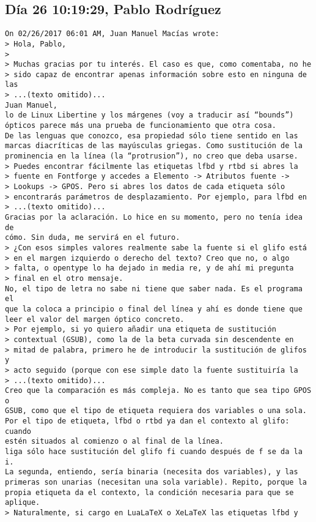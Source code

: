 \documentclass[a4paper,10pt]{article}
\begin{document}
\subsection{Día 26 10:19:29, Pablo Rodríguez}

\begin{lstlisting}
On 02/26/2017 06:01 AM, Juan Manuel Macías wrote:
> Hola, Pablo,
> 
> Muchas gracias por tu interés. El caso es que, como comentaba, no he
> sido capaz de encontrar apenas información sobre esto en ninguna de las
> ...(texto omitido)...
Juan Manuel,
lo de Linux Libertine y los márgenes (voy a traducir así “bounds”)
ópticos parece más una prueba de funcionamiento que otra cosa.
De las lenguas que conozco, esa propiedad sólo tiene sentido en las
marcas diacríticas de las mayúsculas griegas. Como sustitución de la
prominencia en la línea (la “protrusion”), no creo que deba usarse.
> Puedes encontrar fácilmente las etiquetas lfbd y rtbd si abres la
> fuente en Fontforge y accedes a Elemento -> Atributos fuente ->
> Lookups -> GPOS. Pero si abres los datos de cada etiqueta sólo
> encontrarás parámetros de desplazamiento. Por ejemplo, para lfbd en
> ...(texto omitido)...
Gracias por la aclaración. Lo hice en su momento, pero no tenía idea de
cómo. Sin duda, me servirá en el futuro.
> ¿Con esos simples valores realmente sabe la fuente si el glifo está
> en el margen izquierdo o derecho del texto? Creo que no, o algo
> falta, o opentype lo ha dejado in media re, y de ahí mi pregunta
> final en el otro mensaje.
No, el tipo de letra no sabe ni tiene que saber nada. Es el programa el
que la coloca a principio o final del línea y ahí es donde tiene que
leer el valor del margen óptico concreto.
> Por ejemplo, si yo quiero añadir una etiqueta de sustitución
> contextual (GSUB), como la de la beta curvada sin descendente en
> mitad de palabra, primero he de introducir la sustitución de glifos y
> acto seguido (porque con ese simple dato la fuente sustituiría la
> ...(texto omitido)...
Creo que la comparación es más compleja. No es tanto que sea tipo GPOS o
GSUB, como que el tipo de etiqueta requiera dos variables o una sola.
Por el tipo de etiqueta, lfbd o rtbd ya dan el contexto al glifo: cuando
estén situados al comienzo o al final de la línea.
liga sólo hace sustitución del glifo fi cuando después de f se da la i.
La segunda, entiendo, sería binaria (necesita dos variables), y las
primeras son unarias (necesitan una sola variable). Repito, porque la
propia etiqueta da el contexto, la condición necesaria para que se aplique.
> Naturalmente, si cargo en LuaLaTeX o XeLaTeX las etiquetas lfbd y

\end{lstlisting}
\end{document}
